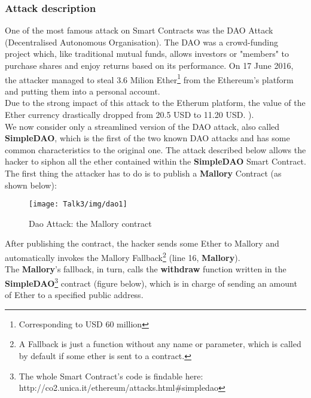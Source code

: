 \subsubsection{Attack description}
One of the most famous attack on Smart Contracts was the DAO Attack (Decentralised Autonomous Organisation)\cite{SC6}.
The DAO was a crowd-funding project which, like traditional mutual funds, allows investors or "members" to purchase shares and enjoy returns based on its performance.
On 17 June 2016, the attacker managed to steal 3.6 Milion Ether\footnote{Corresponding to USD 60 million} from the Ethereum's platform and putting them into a personal account\cite{SC8}.\\ %
Due to the strong impact of this attack to the Etherum platform, the value of the Ether currency drastically dropped from 20.5 USD to 11.20 USD\cite{SC9}.  
). \\
We now consider only a streamlined version of the DAO attack, also called \textbf{SimpleDAO}, which is the first of the two known DAO attacks and has some common characteristics to the original one. The attack described below allows the hacker to siphon all the ether contained within the \textbf{SimpleDAO} Smart Contract.\cite{paper2} \\
The first thing the attacker has to do is to publish a \textbf{Mallory} Contract (as shown below): 
\begin{figure}[H]
\begin{center}
\texttt{[image: Talk3/img/dao1]}
\end{center}
\caption{Dao Attack: the Mallory contract}
\label{label}
\end{figure}
After publishing the contract, the hacker sends some Ether to Mallory and automatically invokes the Mallory Fallback\footnote{A Fallback is just a function without any name or parameter, which is called by default if some ether is sent to a contract\cite{SC10}. } (line 16, \textbf{Mallory}). \\
The \textbf{Mallory}'s fallback, in turn, calls the \textbf{withdraw} function written in the \textbf{SimpleDAO}\footnote{The whole Smart Contract's code is findable here: http://co2.unica.it/ethereum/attacks.html\#simpledao} contract (figure below), which is in charge of sending an amount of Ether to a specified public address. 
